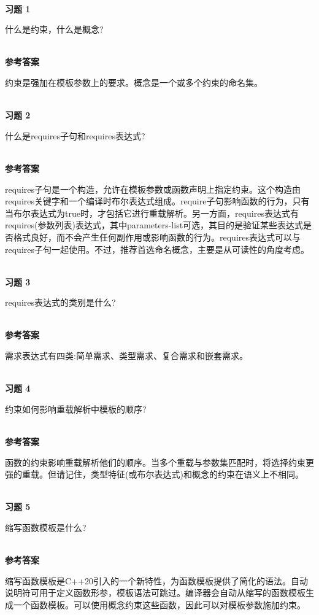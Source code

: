 \hspace*{\fill} \\ %
\noindent
\textbf{习题 1}

什么是约束，什么是概念?

\hspace*{\fill} \\ %
\noindent
\textbf{参考答案}

约束是强加在模板参数上的要求。概念是一个或多个约束的命名集。


\hspace*{\fill} \\ %
\noindent
\textbf{习题 2}

什么是requires子句和requires表达式?

\hspace*{\fill} \\ %
\noindent
\textbf{参考答案}

requires子句是一个构造，允许在模板参数或函数声明上指定约束。这个构造由requires关键字和一个编译时布尔表达式组成。require子句影响函数的行为，只有当布尔表达式为true时，才包括它进行重载解析。另一方面，requires表达式有requires(参数列表)表达式，其中parameters-list可选，其目的是验证某些表达式是否格式良好，而不会产生任何副作用或影响函数的行为。requires表达式可以与requires子句一起使用。不过，推荐首选命名概念，主要是从可读性的角度考虑。

\hspace*{\fill} \\ %
\noindent
\textbf{习题 3}

requires表达式的类别是什么?

\hspace*{\fill} \\ %
\noindent
\textbf{参考答案}

需求表达式有四类:简单需求、类型需求、复合需求和嵌套需求。

\hspace*{\fill} \\ %
\noindent
\textbf{习题 4}

约束如何影响重载解析中模板的顺序?

\hspace*{\fill} \\ %
\noindent
\textbf{参考答案}

函数的约束影响重载解析他们的顺序。当多个重载与参数集匹配时，将选择约束更强的重载。但请记住，类型特征(或布尔表达式)和概念的约束在语义上不相同。

\hspace*{\fill} \\ %
\noindent
\textbf{习题 5}

缩写函数模板是什么?

\hspace*{\fill} \\ %
\noindent
\textbf{参考答案}

缩写函数模板是C++20引入的一个新特性，为函数模板提供了简化的语法。自动说明符可用于定义函数形参，模板语法可跳过。编译器会自动从缩写的函数模板生成一个函数模板。可以使用概念约束这些函数，因此可以对模板参数施加约束。












